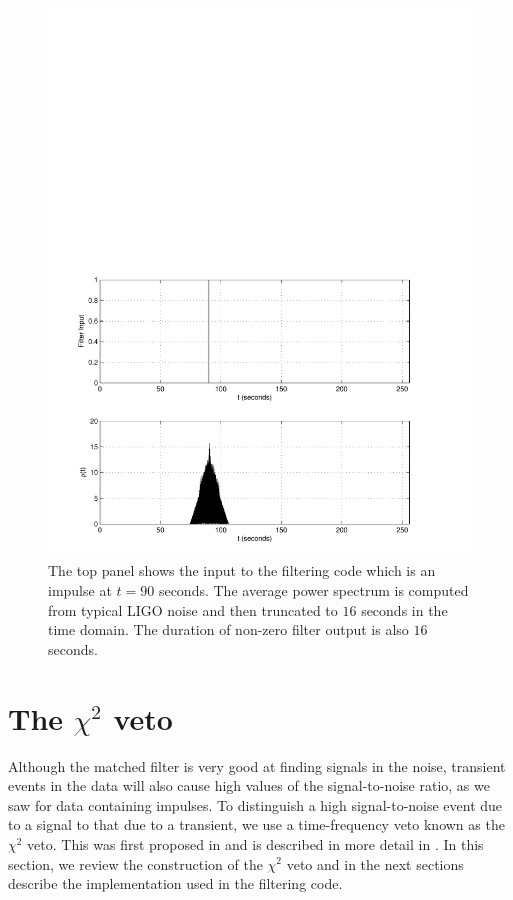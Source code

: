 \begin{figure}[htb]
\label{f:impulse_inv_spec}
\begin{center}
\includegraphics[width=\linewidth]{figures/findchirp/impulse_inv_spec}
\end{center}
\caption{%
The top panel shows the input to the filtering code which is an impulse at $t
= 90$ seconds. The average power spectrum is computed from typical LIGO noise
and then truncated to $16$ seconds in the time domain. The duration of non-zero
filter output is also $16$ seconds.
}
\end{figure}

\section{The $\chi^2$ veto}
\label{s:chisqcts}

Although the matched filter is very good at finding signals in the noise,
transient events in the data will also cause high values of the
signal-to-noise ratio, as we saw for data containing impulses. To distinguish
a high signal-to-noise event due to a signal to that due to a transient, we
use a time-frequency veto known as the $\chi^2$ veto. This was first proposed
in \cite{grasp} and is described in more detail in \cite{brucechisqpaper}.
In this section, we review the construction of the $\chi^2$ veto and in the
next sections describe the implementation used in the filtering code.


